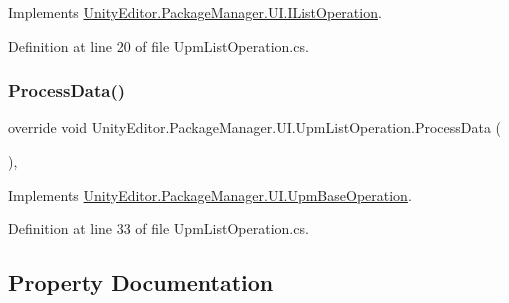 Implements \mbox{\hyperlink{interface_unity_editor_1_1_package_manager_1_1_u_i_1_1_i_list_operation_af9786e05457b17b3cc3a5fdc4a5b42ae}{Unity\+Editor.\+Package\+Manager.\+U\+I.\+I\+List\+Operation}}.



Definition at line 20 of file Upm\+List\+Operation.\+cs.

\mbox{\label{class_unity_editor_1_1_package_manager_1_1_u_i_1_1_upm_list_operation_ae7434ca3a6b01a299d8a9860dbd32832}} 
\subsubsection{\texorpdfstring{ProcessData()}{ProcessData()}}
{\footnotesize\ttfamily override void Unity\+Editor.\+Package\+Manager.\+U\+I.\+Upm\+List\+Operation.\+Process\+Data (\begin{DoxyParamCaption}{ }\end{DoxyParamCaption})\hspace{0.3cm}{\ttfamily [protected]}, {\ttfamily [virtual]}}



Implements \mbox{\hyperlink{class_unity_editor_1_1_package_manager_1_1_u_i_1_1_upm_base_operation_a5a4730e21b4cea1052e494cc5ca0eb84}{Unity\+Editor.\+Package\+Manager.\+U\+I.\+Upm\+Base\+Operation}}.



Definition at line 33 of file Upm\+List\+Operation.\+cs.



\subsection{Property Documentation}
\mbox{\label{class_unity_editor_1_1_package_manager_1_1_u_i_1_1_upm_list_operation_a68c64342288c2f07fd403e91ad6cc6e7}} 
